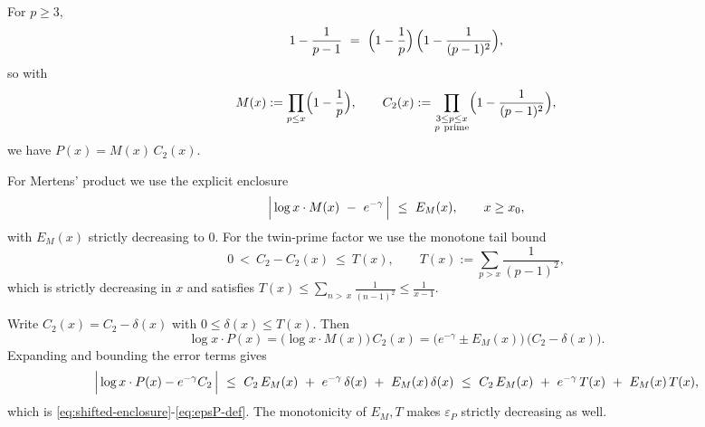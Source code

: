 \documentclass[11pt]{article}
\makeatletter
\theoremstyle{inline}
\theoremstyle{break}
\renewenvironment{proof}[1][\proofname]{%
  \par\pushQED{\qed}%
  \normalfont \topsep6\p@\@plus6\p@\relax
  \trivlist
  \item[\hskip\labelsep
        \itshape
    #1\@addpunct{.}]\mbox{}\\  %
}{%
  \popQED\endtrivlist\@endpefalse
}
\theoremstyle{break}
\theoremstyle{break}
\theoremstyle{break}
\theoremstyle{break}
\theoremstyle{break}
\theoremstyle{break}
\theoremstyle{inline}
\makeatother
\begin{document}
\begin{proof}
For \(p\ge 3\),
\begin{equation}\label{eq:factor-identity}
1-\frac{1}{p-1}
\ =\
\Bigl(1-\frac{1}{p}\Bigr)\,\Bigl(1-\frac{1}{(p-1)^2}\Bigr),
\end{equation}
so with
\begin{equation}\label{eq:M-and-C2-partial}
M(x):=\prod_{p\le x}\Bigl(1-\frac{1}{p}\Bigr),
\qquad
C_2(x):=\prod_{\substack{3\le p\le x\\ p\ \mathrm{prime}}}\Bigl(1-\frac{1}{(p-1)^2}\Bigr),
\end{equation}
we have \(P(x)=M(x)\,C_2(x)\).

For Mertens’ product we use the explicit enclosure
\begin{equation}\label{eq:EM-def}
\Bigl|\,\log x\cdot M(x)\ -\ e^{-\gamma}\,\Bigr|\ \le\ E_M(x),
\qquad x\ge x_0,
\end{equation}
with \(E_M(x)\) strictly decreasing to \(0\).  
For the twin-prime factor we use the monotone tail bound
\begin{equation}\label{eq:T-def}
0\ <\ C_2 - C_2(x)\ \le\ T(x),
\qquad
T(x):=\sum_{p>x}\frac{1}{(p-1)^2},
\end{equation}
which is strictly decreasing in \(x\) and satisfies \(T(x)\le \sum_{n>\,x}\frac{1}{(n-1)^2}\le \frac{1}{x-1}\).

Write \(C_2(x)=C_2-\delta(x)\) with \(0\le \delta(x)\le T(x)\).
Then
\begin{equation}\label{eq:linearization-step}
\log x\cdot P(x)
=\bigl(\log x\cdot M(x)\bigr)\,C_2(x)
=\bigl(e^{-\gamma}\pm E_M(x)\bigr)\,\bigl(C_2-\delta(x)\bigr).
\end{equation}
Expanding and bounding the error terms gives
\begin{equation}\label{eq:collect-errors}
\Bigl|\,\log x\cdot P(x)-e^{-\gamma}C_2\,\Bigr|
\ \le\ C_2\,E_M(x)\ +\ e^{-\gamma}\,\delta(x)\ +\ E_M(x)\,\delta(x)
\ \le\ C_2\,E_M(x)\ +\ e^{-\gamma}\,T(x)\ +\ E_M(x)\,T(x),
\end{equation}
which is \eqref{eq:shifted-enclosure}-\eqref{eq:epsP-def}.  
The monotonicity of \(E_M,T\) makes \(\varepsilon_P\) strictly decreasing as well.
\end{proof}

\end{document}
